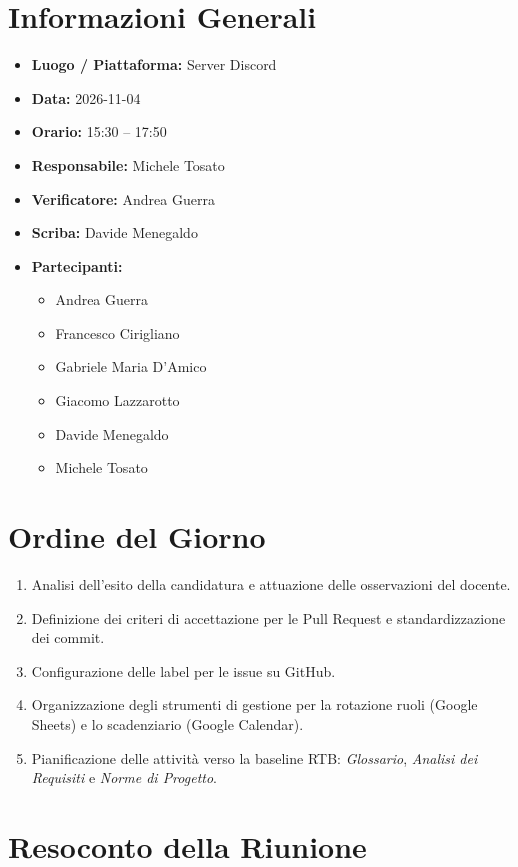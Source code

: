\documentclass[11pt, a4paper]{article}
\newcommand{\DocDate}{2026-11-04}
\begin{document}
\section{Informazioni Generali}
\begin{itemize}
    \item \textbf{Luogo / Piattaforma:} Server Discord
    \item \textbf{Data:} \DocDate
    \item \textbf{Orario:} 15:30 -- 17:50
    \item \textbf{Responsabile:} Michele Tosato
    \item \textbf{Verificatore:} Andrea Guerra
    \item \textbf{Scriba:} Davide Menegaldo
    \item \textbf{Partecipanti:}
        \begin{itemize}
            \item Andrea Guerra
            \item Francesco Cirigliano
            \item Gabriele Maria D'Amico
            \item Giacomo Lazzarotto
            \item Davide Menegaldo
            \item Michele Tosato
        \end{itemize}
\end{itemize}
\clearpage


\section{Ordine del Giorno}
\begin{enumerate}
    \item Analisi dell'esito della candidatura e attuazione delle osservazioni del docente.
    \item Definizione dei criteri di accettazione per le Pull Request e standardizzazione dei commit.
    \item Configurazione delle label per le issue su GitHub.
    \item Organizzazione degli strumenti di gestione per la rotazione ruoli (Google Sheets) e lo scadenziario (Google Calendar).
    \item Pianificazione delle attività verso la baseline RTB: \textit{Glossario}, \textit{Analisi dei Requisiti} e \textit{Norme di Progetto}.
\end{enumerate}


\section{Resoconto della Riunione}
\end{document}
